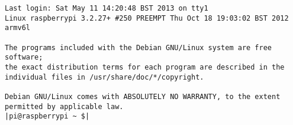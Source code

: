 \begin{lstlisting}
Last login: Sat May 11 14:20:48 BST 2013 on tty1                                                                                                   Linux raspberrypi 3.2.27+ #250 PREEMPT Thu Oct 18 19:03:02 BST 2012 armv6l

The programs included with the Debian GNU/Linux system are free software;
the exact distribution terms for each program are described in the
individual files in /usr/share/doc/*/copyright.

Debian GNU/Linux comes with ABSOLUTELY NO WARRANTY, to the extent
permitted by applicable law.
|pi@raspberrypi ~ $|
\end{lstlisting}
